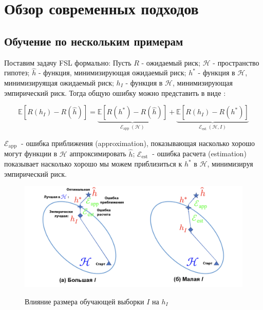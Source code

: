 \section{Обзор современных подходов}
\label{sec:Chapter1} 
\subsection{Обучение по нескольким примерам}

Поставим задачу FSL формально:  Пусть $R$ - ожидаемый риск; $\mathcal{H}$ - пространство гипотез; $\hat{h}$ - функция, минимизирующая ожидаемый риск; $h^*$ - функция в $\mathcal{H}$, минимизируящая ожидаемый риск; $h_I$ - функция в $\mathcal{H}$, минимизирующая эмпирический риск. Тогда общую ошибку можно представить в виде \cite{FSLsurvey}:

\large
$$
\mathbb{E}\left[R\left(h_I\right)-R(\hat{h})\right]=\underbrace{\mathbb{E}\left[R\left(h^*\right)-R(\hat{h})\right]}_{\mathcal{E}_{\text {app }}(\mathcal{H})}+\underbrace{\mathbb{E}\left[R\left(h_I\right)-R\left(h^*\right)\right]}_{\mathcal{E}_{\text {est }}(\mathcal{H}, I)}
$$

\normalsize
$\mathcal{E}_{\text {app }}$ - ошибка приближения (approximation), показывающая насколько хорошо могут функции в $\mathcal{H}$ аппроксимировать $\hat{h}$; $\mathcal{E}_{\text {est }}$ - ошибка расчета (estimation) показывает насколько хорошо мы можем приблизиться к $h^*$ в $\mathcal{H}$, минимизируя эмпирический риск.

\begin{figure}[h!]
\caption{Влияние размера обучающей выборки $I$ на $h_I$}
\centering
\includegraphics[width=16cm]{Images/H_largesmall_I_rus_noback.png}
\label{fig:H_largesmall_I_rus_noback}
\end{figure}

\begin{figure}[h!]

\centering
\end{figure}

